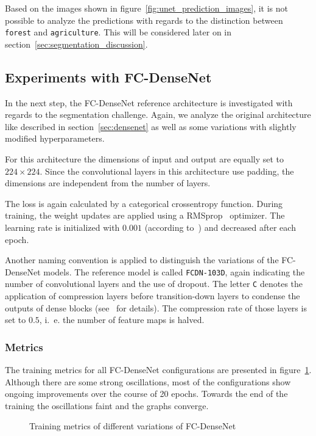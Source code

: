Based on the images shown in figure~\ref{fig:unet_prediction_images}, it is not possible to analyze the predictions with regards to the distinction between \texttt{forest} and \texttt{agriculture}. This will be considered later on in section~\ref{sec:segmentation_discussion}.

\subsection{Experiments with FC-DenseNet}
In the next step, the FC-DenseNet reference architecture is investigated with regards to the segmentation challenge. Again, we analyze the original architecture like described in section~\ref{sec:densenet} as well as some variations with slightly modified hyperparameters.

For this architecture the dimensions of input and output are equally set to $224\times 224$. Since the convolutional layers in this architecture use padding, the dimensions are independent from the number of layers.

The loss is again calculated by a categorical crossentropy function. During training, the weight updates are applied using a RMSprop~\cite{rmsprop14} optimizer. The learning rate is initialized with $0.001$ (according to~\cite{denseseg17}) and decreased after each epoch.

Another naming convention is applied to distinguish the variations of the FC-DenseNet models. The reference model is called \texttt{FCDN-103D}, again indicating the number of convolutional layers and the use of dropout. The letter \texttt{C} denotes the application of compression layers before transition-down layers to condense the outputs of dense blocks (see~\cite{denseseg17} for details). The compression rate of those layers is set to $0.5$, i.~e. the number of feature maps is halved.

\subsubsection{Metrics}
The training metrics for all FC-DenseNet configurations are presented in figure~\ref{fig:densenet_train_metrics}. Although there are some strong oscillations, most of the configurations show ongoing improvements over the course of 20 epochs. Towards the end of the training the oscillations faint and the graphs converge.

\begin{figure}
    \newcommand{\DensenetMetricsImageWidth}{0.32\textwidth}
    \centering
            
    \caption{Training metrics of different variations of FC-DenseNet}
    \label{fig:densenet_train_metrics}
\end{figure}

